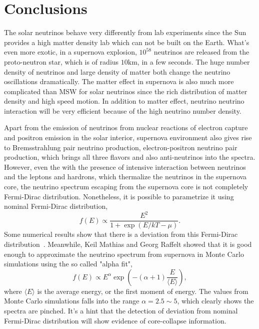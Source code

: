 



\section{\label{conclusions}Conclusions}



The solar neutrinos behave very differently from lab experiments since the Sun provides a high matter density lab which can not be built on the Earth. What's even more exotic, in a supernova explosion, $10^{58}$ neutrinos are released from the proto-neutron star, which is of radius $10\mathrm{km}$, in a few seconds. The huge number density of neutrinos and large density of matter both change the neutrino oscillations dramatically. The matter effect in supernova is also much more complicated than MSW for solar neutrinos since the rich distribution of matter density and high speed motion. In addition to matter effect, neutrino neutrino interaction will be very efficient because of the high neutrino number density.

Apart from the emission of neutrinos from nuclear reactions of electron capture and positron emission in the solar interior, supernova environment also gives rise to Bremsstrahlung pair neutrino production, electron-positron neutrino pair production, which brings all three flavors and also anti-neutrinos into the spectra. However, even the with the presence of intensive interaction between neutrinos and the leptons and hardrons, which thermalize the neutrinos in the supernova core, the neutrino spectrum escaping from the supernova core is not completely Fermi-Dirac distribution. Nonetheless, it is possible to parametrize it using nominal Fermi-Dirac distribution,\cite{ysuzuki2004}
\begin{equation}
f(E)\propto \frac{E^2}{1+\exp ( E/kT - \mu )}.
\end{equation}
Some numerical results show that there is a deviation from this Fermi-Dirac distribution~\cite{Totani1998,Keil2003}. Meanwhile, Keil Mathias and Georg Raffelt showed that it is good enough to approximate the neutrino spectrum from supernova in Monte Carlo simulations using the so called "alpha fit",
\begin{equation}
f(E)\propto E^\alpha \exp\left( -(\alpha+1)\frac{E}{\langle E\rangle} \right),
\end{equation}
where $\langle E\rangle$ is the average energy, or the first moment of energy. The values from Monte Carlo simulations falls into the range $\alpha = 2.5\sim 5$,
which clearly shows the spectra are pinched. It's a hint that the detection of deviation from nominal Fermi-Dirac distribution will show evidence of core-collapse information.


